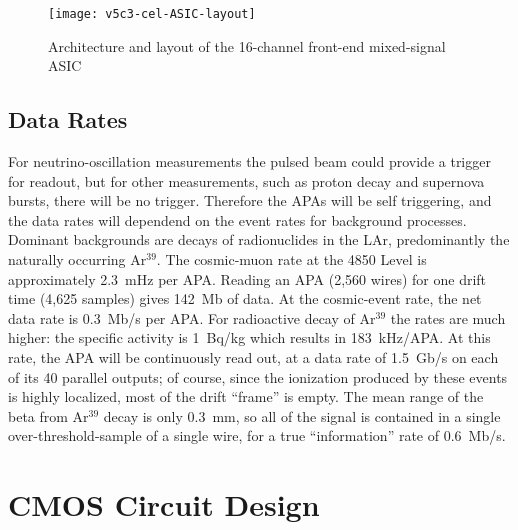 \begin{figure}[htbp]
\centering
\texttt{[image: v5c3-cel-ASIC-layout]}
\caption{Architecture and layout of the 16-channel front-end mixed-signal ASIC}
\label{fig:elec_asic_layout}
\end{figure}

%
\subsection{Data Rates}
\label{subsec:fe-arch-rates}

For neutrino-oscillation measurements the pulsed beam could provide a
trigger for readout, but for other measurements, such as proton decay
and supernova bursts, there will be no trigger.
Therefore the APAs will be self triggering, and the
data rates will dependend on the event rates for background processes.
Dominant backgrounds are decays of radionuclides in the LAr, predominantly the naturally occurring Ar$^{39}$.
The cosmic-muon rate at the 4850 Level is approximately 2.3~mHz per APA.
Reading an APA (2,560 wires) for one drift time (4,625 samples) gives 142~Mb of data.
At the cosmic-event rate, the net data rate is 0.3~Mb/s per APA.
For radioactive decay of Ar$^{39}$ the rates are much higher: the specific activity is 1~Bq/kg which results in 183~kHz/APA.
At this rate, the APA will be continuously read out,
at a data rate of 1.5~Gb/s on each of its 40 parallel outputs;
of course, since the ionization produced by these events is highly localized,
most of the drift ``frame'' is empty.
The mean range of the beta from Ar$^{39}$ decay is only 0.3~mm, so all
of the signal is contained in a single over-threshold-sample of a single wire, for a true ``information''
rate of 0.6~Mb/s.


%
\section{CMOS Circuit Design}
\label{sec:fe-CMOS}

